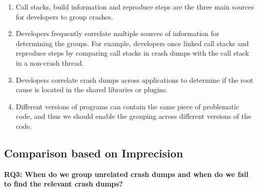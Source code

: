 \documentclass{llncs}
\newcommand{\todo}[1]{\textcolor{cyan}{\textbf{[#1]}}}
\begin{document}
\begin{enumerate}
\item Call stacks, build information and reproduce steps are the three main sources for developers to group crashes.
\item Developers frequently correlate multiple sources of information for determining the groups. For example, developers once linked call stacks and reproduce steps by comparing call stacks in crash dumps with the call stack in a non-crash thread.
\item Developers correlate crash dumps across applications to determine if the root cause is located in the shared libraries or plugins.
\item Different versions of programs can contain the same piece of problematic code, and thus we should enable the grouping across different versions of the code.
\end{enumerate}





\subsection{Comparison based on Imprecision}

\textbf{RQ3: When do we group unrelated crash dumps and when do we fail to find the relevant crash dumps?}
\end{document}

